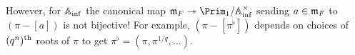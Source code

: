 \documentclass[a4paper, 10pt, oneside, DIV=9, chapterprefix=true, numbers=enddot,bibliography=totoc]{scrbook}
\begin{document}
However, for $\mathbb{A}_{\mathrm{inf}}$ the canonical map $\mm_F\epimorphism\Prim_1/\IA_\inf^\times$ sending $a\in\mathfrak{m}_F$ to $(\pi-[a])$ is not bijective! For example, $(\pi-[\pi^\flat])$ depends on choices of $(q^n)^{\text{th}}$ roots of $\pi$ to get $\pi^\flat=(\pi,\pi^{1/q},\dotsc)$.

\appendix
\backmatter{}
\printbibliography
\end{document}
